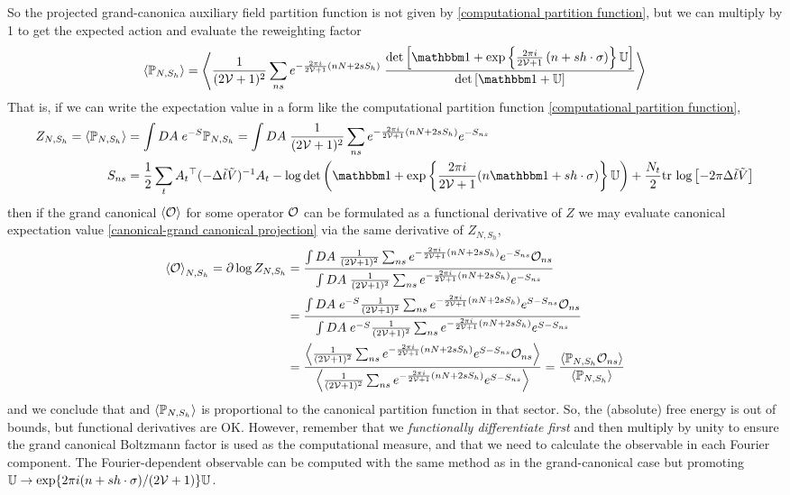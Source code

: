 So the projected grand-canonica auxiliary field partition function is not given by \eqref{computational partition function}, but we can multiply by 1 to get the expected action and evaluate the reweighting factor
\begin{align}
	\expectation{\PP_{N, S_h}}
	=
	\expectation{
		\oneover{(2\Volume+1)^2} \sum_{ns} e^{-\frac{2\pi i}{2\Volume+1} (nN+2sS_h)}\; \frac{
			\det\left[ \one + \exp\left\{ \frac{2\pi i}{2\Volume+1}\left(n + s h \cdot \sigma\right)\right\} \UU\right]
		}{
			\det\left[ \one + \UU \right]
		}
	}
	\label{eq:grand canonical projector representation}
\end{align}
That is, if we can write the expectation value in a form like the computational partition function \eqref{computational partition function},
\begin{align}
	Z_{N, S_h} = \expectation{\PP_{N,S_h}} &= \int DA\; e^{-S} \PP_{N, S_h} = \int DA\; \oneover{(2\Volume+1)^2}\sum_{ns} e^{-\frac{2\pi i}{2\Volume+1}(nN+2sS_h)} e^{-S_{ns}}
	\\
	S_{ns} &= \half \sum_{t} A_t\transpose (-\Delta\tilde{t}\tilde{V})\inverse A_t - \log\det\left(\one+\exp\left\{\frac{2\pi i}{2\Volume+1}(n\one+s h\cdot\sigma)\right\}\UU\right) + \frac{N_t}{2} \trlog{ -2\pi \Delta\tilde{t}\tilde{V}}
\end{align}
then if the grand canonical $\left\langle \mathcal{O} \right\rangle$ for some operator $\mathcal{O}$ can be formulated as a functional derivative of $Z$ we may evaluate canonical expectation value \eqref{canonical-grand canonical projection} via the same derivative of $Z_{N, S_h}$,
\begin{align}
	\left\langle \mathcal{O} \right\rangle_{N,S_h} = \partial \log Z_{N, S_h}
	&= \frac{\int DA\; \frac{1}{(2\mathcal{V}+1)^2}\sum_{ns} e^{-\frac{2\pi i}{2\mathcal{V}+1}(nN+2sS_h)} e^{-S_{ns}} \mathcal{O}_{ns}}{\int DA\; \frac{1}{(2\mathcal{V}+1)^2}\sum_{ns} e^{-\frac{2\pi i}{2\mathcal{V}+1}(nN+2sS_h)} e^{-S_{ns}}}
	\nonumber\\
	&= \frac{\int DA\; e^{-S} \frac{1}{(2\mathcal{V}+1)^2}\sum_{ns} e^{-\frac{2\pi i}{2\mathcal{V}+1}(nN+2sS_h)} e^{S-S_{ns}} \mathcal{O}_{ns}}{\int DA\; e^{-S}\frac{1}{(2\mathcal{V}+1)^2}\sum_{ns} e^{-\frac{2\pi i}{2\mathcal{V}+1}(nN+2sS_h)} e^{S-S_{ns}}}
	\nonumber\\
	&= \frac{\left\langle \frac{1}{(2\mathcal{V}+1)^2}\sum_{ns} e^{-\frac{2\pi i}{2\mathcal{V}+1}(nN+2sS_h)} e^{S-S_{ns}} \mathcal{O}_{ns} \right\rangle}{\left\langle \frac{1}{(2\mathcal{V}+1)^2}\sum_{ns} e^{-\frac{2\pi i}{2\mathcal{V}+1}(nN+2sS_h)} e^{S-S_{ns}} \right\rangle}
	= \frac{\left\langle \mathbb{P}_{N,S_h} \mathcal{O}_{ns} \right\rangle}{\left\langle \mathbb{P}_{N,S_h} \right\rangle}
\end{align}
and we conclude that and $\left\langle \mathbb{P}_{N,S_h} \right\rangle$ is proportional to the canonical partition function in that sector.
So, the (absolute) free energy is out of bounds, but functional derivatives are OK.
However, remember that we \emph{functionally differentiate first} and then multiply by unity to ensure the grand canonical Boltzmann factor is used as the computational measure, and that we need to calculate the observable in each Fourier component.
The Fourier-dependent observable can be computed with the same method as in the grand-canonical case but promoting $\mathbb{U} \rightarrow \exp\{2\pi i(n+sh\cdot\sigma)/(2\mathcal{V}+1)\}\mathbb{U}$.
